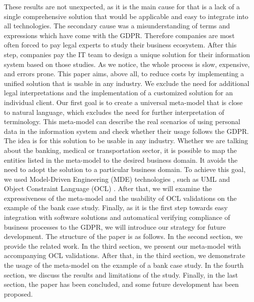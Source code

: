 \documentclass[11pt,english]{article}
\begin{document}
\newline These results are not unexpected, as it is the main cause for that is a lack of a single comprehensive solution that would be applicable and easy to integrate into all technologies. The secondary cause was a misunderstanding of terms and expressions which have come with the GDPR. Therefore companies are most often forced to pay legal experts to study their business ecosystem. After this step, companies pay the IT team to design a unique solution for their information system based on those studies. As we notice, the whole process is slow, expensive, and errors prone. \newline This paper aims, above all, to reduce costs by implementing a unified solution that is usable in any industry. We exclude the need for additional legal interpretations and the implementation of a customized solution for an individual client. Our first goal is to create a universal meta-model that is close to natural language, which excludes the need for further interpretation of terminology. This meta-model can describe the real scenarios of using personal data in the information system and check whether their usage follows the GDPR. The idea is for this solution to be usable in any industry. Whether we are talking about the banking, medical or transportation sector, it is possible to map the entities listed in the meta-model to the desired business domain. It avoids the need to adopt the solution to a particular business domain. To achieve this goal, we used Model-Driven Engineering (MDE) technologies \cite{mde}, such as UML \cite{uml} and Object Constraint Language (OCL) \cite{ocl}. After that, we will examine the expressiveness of the meta-model and the usability of OCL validations on the example of the bank case study. Finally, as it is the first step towards easy integration with software solutions and automatical verifying compliance of business processes to the GDPR, we will introduce our strategy for future development. \newline The structure of the paper is as follows. In the second section, we provide the related work. In the third section, we present our meta-model with accompanying OCL validations. After that, in the third section, we demonstrate the usage of the meta-model on the example of a bank case study. In the fourth section, we discuss the results and limitations of the study. Finally, in the last section, the paper has been concluded, and some future development has been proposed.
\end{document}
